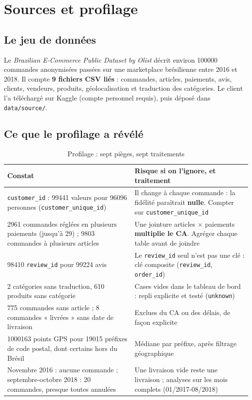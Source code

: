 \documentclass[11pt, a4paper, oneside, headings=normal, numbers=noenddot, DIV=12]{scrartcl}
\begin{document}
\section{Sources et profilage}

\subsection{Le jeu de données}
Le \emph{Brazilian E-Commerce Public Dataset by Olist} décrit environ \num{100000} commandes anonymisées passées sur une marketplace
brésilienne entre 2016 et 2018. Il compte \textbf{9 fichiers CSV liés} : commandes, articles, paiements, avis, clients, vendeurs, produits,
géolocalisation et traduction des catégories. Le client l'a téléchargé sur Kaggle (compte personnel requis), puis déposé dans
\texttt{data/source/}.

\subsection{Ce que le profilage a révélé}
\begin{table}[H]
\centering\small
\begin{tabularx}{\linewidth}{@{}L{5.6cm} Y@{}}
\toprule
\textbf{Constat} & \textbf{Risque si on l'ignore, et traitement} \\
\midrule
\texttt{customer\_id} : \num{99441} valeurs pour \num{96096} personnes (\texttt{customer\_unique\_id}) & Il change à chaque commande : la fidélité paraîtrait \textbf{nulle}. Compter sur \texttt{customer\_unique\_id} \\
\num{2961} commandes réglées en plusieurs paiements (jusqu'à 29) ; \num{9803} commandes à plusieurs articles & Une jointure articles × paiements \textbf{multiplie le CA}. Agréger chaque table avant de joindre \\
\num{98410} \texttt{review\_id} pour \num{99224} avis & Le \texttt{review\_id} seul n'est pas une clé : clé composite (\texttt{review\_id}, \texttt{order\_id}) \\
2 catégories sans traduction, 610 produits sans catégorie & Cases vides dans le tableau de bord : repli explicite et testé (\texttt{unknown}) \\
775 commandes sans article ; 8 commandes « livrées » sans date de livraison & Exclues du CA ou des délais, de façon explicite \\
\num{1000163} points GPS pour \num{19015} préfixes de code postal, dont certains hors du Brésil & Médiane par préfixe, après filtrage géographique \\
Novembre 2016 : aucune commande ; septembre-octobre 2018 : 20 commandes, presque toutes annulées & Une livraison vide reste une livraison ; analyses sur les mois complets (01/2017-08/2018) \\
\bottomrule
\end{tabularx}
\caption{Profilage : sept pièges, sept traitements}
\end{table}
\end{document}

